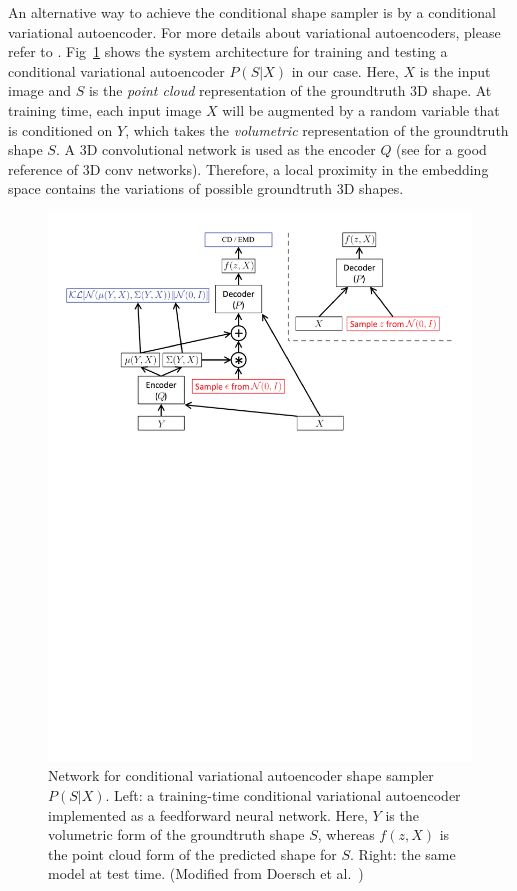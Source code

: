An alternative way to achieve the conditional shape sampler is by a conditional variational autoencoder. For more details about variational autoencoders, please refer to \cite{doersch2016tutorial}.  Fig~\ref{fig:VAE} shows the system architecture for training and testing a conditional variational autoencoder $P(S|X)$ in our case. Here, $X$ is the input image and $S$ is the \emph{point cloud} representation of the groundtruth 3D shape. At training time, each input image $X$ will be augmented by a random variable that is conditioned on $Y$, which takes the \emph{volumetric} representation of the groundtruth shape $S$. A 3D convolutional network is used as the encoder $Q$ (see \cite{maturana2015voxnet} for a good reference of 3D conv networks). Therefore, a local proximity in the embedding space contains the variations of possible groundtruth 3D shapes.

\begin{figure}
\centering
\includegraphics[width=\linewidth]{./fig/vae.pdf}
\caption{Network for conditional variational autoencoder shape sampler $P(S|X)$. Left: a training-time conditional variational autoencoder implemented as a feedforward neural network. Here, $Y$ is the volumetric form of the groundtruth shape $S$, whereas $f(z, X)$ is the point cloud form of the predicted shape for $S$. Right: the same model at test time. (Modified from Doersch et al.~\cite{doersch2016tutorial})}
\label{fig:VAE}
\end{figure}




